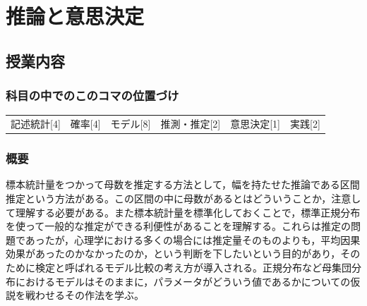 \section{推論と意思決定}
\label{D1_lesson17}

\subsection{授業内容}
\subsubsection{科目の中でのこのコマの位置づけ}
\begin{tabular}[t]{cccccc}
    記述統計[4] & 確率[4] & モデル[8] & 推測・推定[2] & 意思決定[1] & 実践[2]
\end{tabular}
\subsubsection{概要}
標本統計量をつかって母数を推定する方法として，幅を持たせた推論である区間推定という方法がある。この区間の中に母数があるとはどういうことか，注意して理解する必要がある。また標本統計量を標準化しておくことで，標準正規分布を使って一般的な推定ができる利便性があることを理解する。これらは推定の問題であったが，心理学における多くの場合には推定量そのものよりも，平均因果効果があったのかなかったのか，という判断を下したいという目的があり，そのために検定と呼ばれるモデル比較の考え方が導入される。正規分布など母集団分布におけるモデルはそのままに，パラメータがどういう値であるかについての仮説を戦わせるその作法を学ぶ。
